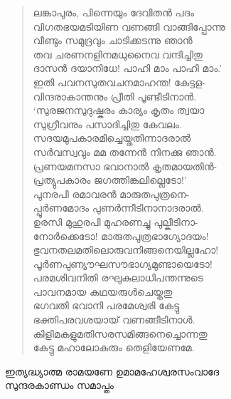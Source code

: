 \begin{verse}
ലങ്കാപുരം, പിന്നെയും ദേവിതന്‍ പദം\\
വിഗതഭയമടിയിണ വണങ്ങി വാങ്ങിപ്പോന്നു\\
വീണ്ടും സമുദ്രവും ചാടിക്കടന്നു ഞാന്‍\\
തവ ചരണനളിനമധുനൈവ വന്ദിച്ചിതു\\
ദാസന്‍ ദയാനിധേ! പാഹി മാം പാഹി മാം.’\\
ഇതി പവനസുതവചനമാഹന്ത! കേട്ടള-\\
വിന്ദരാകാന്തനും പ്രീതി പൂണ്ടീടിനാന്‍.\\
‘സുരജനസുദുഷ്കരം കാര്യം കൃതം ത്വയാ\\
സുഗ്രീവനും പസാദിച്ചിതു കേവലം.\\
സദയമുപകാരമിച്ചെയ്തതിന്നാദരാല്‍\\
സര്‍വസ്വവും മമ തന്നേന്‍ നിനക്കു ഞാന്‍.\\
പ്രണയമനസാ ഭവാനാല്‍ കൃതമായതിന്‍-\\
പ്രത്യുപകാരം ജഗത്തിങ്കലില്ലെടോ!’\\
പുനരപി രമാവരന്‍ മാരുതപുത്രനെ-\\
പ്പൂര്‍ണമോദം പുണര്‍ന്നീടിനാനാദരാല്‍.\\
ഉരസി മുഹുരപി മുഹരണച്ചു പുല്കീടിനാ-\\
നോര്‍ക്കെടോ! മാരുതപുത്രഭാഗ്യോദയം!\\
ഭുവനതലമതിലൊരുവനിങ്ങനെയില്ലഹോ!\\
പൂര്‍ണപുണ്യൗഘസൗഭാഗ്യമുണ്ടായെടോ!\\
പരമശിവനിതി രഘുകുലാധിപന്തന്നുടെ\\
പാവനമായ കഥയരുള്‍ചെയ്തതു\\
ഭഗവതി ഭവാനി പരമേശ്വരി കേട്ടു\\
ഭക്തിപരവശയായ് വണങ്ങീടിനാള്‍.\\
കിളിമകളുമതിസരസമിങ്ങനെച്ചൊന്നതു\\
കേട്ടു മഹാലോകരും തെളിയേണമേ.
\end{verse}

\begin{center}
ഇത്യദ്ധ്യാത്മ രാമയണേ ഉമാമഹേശ്വരസംവാദേ\\
സുന്ദരകാണ്ഡം സമാപ്തം
\end{center}
